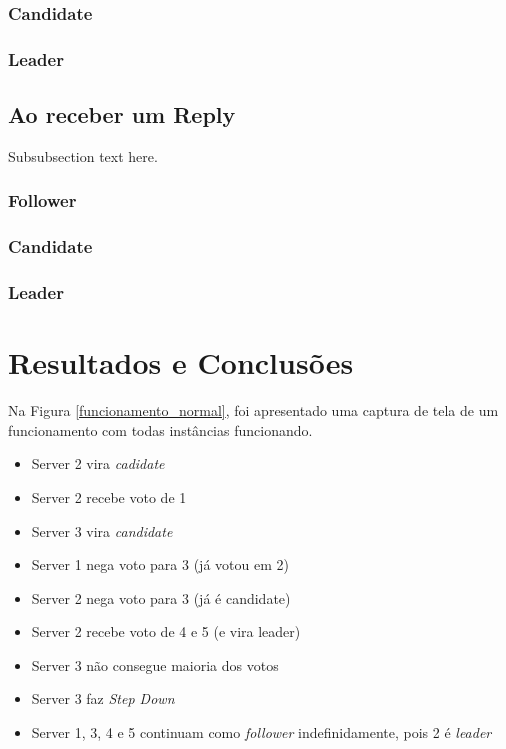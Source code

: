\documentclass[journal,onecolumn]{IEEEtran}
\begin{document}
\subsubsection{Candidate}
\subsubsection{Leader}

\subsection{Ao receber um Reply}
Subsubsection text here.

\subsubsection{Follower}
\subsubsection{Candidate}
\subsubsection{Leader}

\section{Resultados e Conclusões}

Na Figura \ref{funcionamento_normal}, foi apresentado uma captura de tela de um funcionamento com todas instâncias funcionando.

\begin{itemize}
\item Server 2 vira \textit{cadidate}
\item Server 2 recebe voto de 1
\item Server 3 vira \textit{candidate}
\item Server 1 nega voto para 3 (já votou em 2)
\item Server 2 nega voto para 3 (já é candidate)
\item Server 2 recebe voto de 4 e 5 (e vira leader)
\item Server 3 não consegue maioria dos votos
\item Server 3 faz \textit{Step Down}
\item Server 1, 3, 4 e 5 continuam como \textit{follower} indefinidamente, pois 2 é \textit{leader}

\end{itemize}
\end{document}
